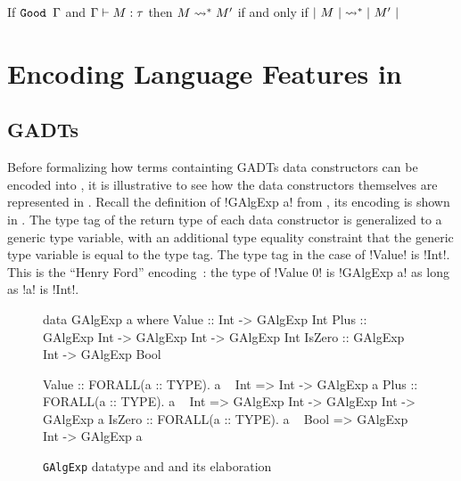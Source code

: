 \documentclass[screen,nonacm,manuscript,review]{acmart} %
\begin{document}
\begin{corollary}\label{cor:sfc-erasure-soundness}
  If $\texttt{Good~}\Gamma$ and $\Gamma \vdash M : \tau$
  then $M \rightsquigarrow^* M'$ if and only if $|~{M}~| \rightsquigarrow^* |~{M'}~|$
\end{corollary}


\section{Encoding Language Features in \SFC}\label{sec:sfc-encoding-features}%
\subsection{GADTs}\label{sec:fc-encodes-gadts}
Before formalizing how terms containting GADTs data constructors can be encoded into \SFC,
it is illustrative to see how the data constructors themselves are represented in \SFC.
Recall the definition of !GAlgExp a! from , its \SFC encoding is
shown in . The type tag of the return type of each data constructor
is generalized to a generic type variable,
with an additional type equality constraint that the generic type variable is equal
to the type tag. The type tag in the case of !Value! is !Int!. This is the
``Henry Ford'' encoding~\cite{chapman_gentle_2010}:
the type of !Value 0! is !GAlgExp a! as long as !a! is !Int!.

\begin{figure}[ht]
\centering
\begin{minipage}[ht]{0.6\linewidth}
\begin{CenteredBox}
\begin{code}
data GAlgExp a where
  Value  :: Int         -> GAlgExp Int
  Plus   :: GAlgExp Int
         -> GAlgExp Int -> GAlgExp Int
  IsZero :: GAlgExp Int
                        -> GAlgExp Bool
\end{code}
\end{CenteredBox}
\end{minipage}%
\begin{minipage}[ht]{0.4\linewidth}
\begin{CenteredBox}
\begin{code}

Value :: FORALL(a :: TYPE). a ~ Int => Int -> GAlgExp a
Plus  :: FORALL(a :: TYPE). a ~ Int => GAlgExp Int
      -> GAlgExp Int -> GAlgExp a
IsZero :: FORALL(a :: TYPE). a ~ Bool => GAlgExp Int
       -> GAlgExp a
\end{code}
\end{CenteredBox}
\end{minipage}%
\caption{\texttt{GAlgExp} datatype and and its \SFC elaboration}
\label{fig:galgexp-sfc-encode}
\end{figure}
\end{document}

